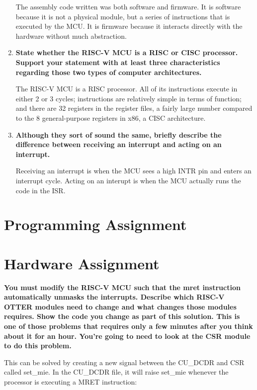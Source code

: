 \documentclass{article}
\begin{document}
\begin{enumerate}
    The assembly code written was both software and firmware. It is software because it is not a physical module, but a series of instructions that is executed by the MCU. It is firmware because it interacts directly with the hardware without much abstraction. 

    \item\textbf{State whether the RISC-V MCU is a RISC or CISC processor. Support your statement with at least three characteristics regarding those two types of computer architectures.  }
    
    The RISC-V MCU is a RISC processor. All of its instructions execute in either 2 or 3 cycles; instructions are relatively simple in terms of function; and there are 32 registers in the register files, a fairly large number compared to the 8 general-purpose registers in x86, a CISC architecture.

    \item\textbf{Although they sort of sound the same, briefly describe the difference between receiving an interrupt and acting on an interrupt.  }
    
    Receiving an interrupt is when the MCU sees a high INTR pin and enters an interrupt cycle. Acting on an interupt is when the MCU actually runs the code in the ISR. 

\end{enumerate}

\pagebreak
\section{Programming Assignment}


\pagebreak

\section{Hardware Assignment}

\textbf{You must modify the RISC-V MCU such that the mret instruction automatically unmasks the interrupts. Describe which RISC-V OTTER modules need to change and what changes those modules requires. Show the code you change as part of this solution. This is one of those problems that requires only a few minutes after you think about it for an hour. You’re going to need to look at the CSR module to do this problem.}

This can be solved by creating a new signal between the CU\_DCDR and CSR called set\_mie. In the CU\_DCDR file, it will raise set\_mie whenever the processor is executing a MRET instruction:
\end{document}
